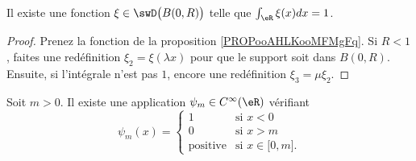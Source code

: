 \begin{corollary}       \label{CORooHHZXooXmwGmC}
	Il existe une fonction \( \xi\in\swD\big( B(0,R) \big)\) telle que \( \int_{\eR}\xi(x)dx=1\).
\end{corollary}

\begin{proof}
	Prenez la fonction de la proposition \ref{PROPooAHLKooMFMgFq}. Si \( R<1\), faites une redéfinition \( \xi_2=\xi(\lambda x)\) pour que le support soit dans \( B(0,R)\). Ensuite, si l'intégrale n'est pas \( 1\), encore une redéfinition \( \xi_3=\mu\xi_2\).
\end{proof}


\begin{lemma}       \label{LEMooRVSIooKcpWoK}
	Soit \( m>0\). Il existe une application \( \psi_m\in  C^{\infty}(\eR)\) vérifiant
	\begin{equation}
		\psi_m(x)=\begin{cases}
			1               & \text{si } x<0                               \\
			0               & \text{si } x>m                               \\
			\text{positive} & \text{si } x\in\mathopen[ 0 , m \mathclose].
		\end{cases}
	\end{equation}
\end{lemma}

